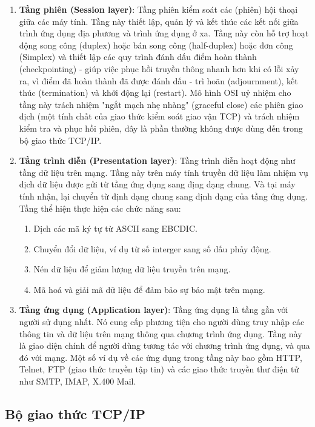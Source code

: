 \documentclass[a4paper,12pt]{article}
\begin{document}
\begin{enumerate}
    \item \textbf{Tầng phiên (Session layer)}: Tầng phiên kiểm soát các (phiên) hội thoại giữa các máy tính. Tầng này thiết lập, quản lý và kết thúc các kết nối giữa trình ứng dụng địa phương và trình ứng dụng ở xa. Tầng này còn hỗ trợ hoạt động song công (duplex) hoặc bán song công (half-duplex) hoặc đơn công (Simplex) và thiết lập các quy trình đánh dấu điểm hoàn thành (checkpointing) - giúp việc phục hồi truyền thông nhanh hơn khi có lỗi xảy ra, vì điểm đã hoàn thành đã được đánh dấu - trì hoãn (adjournment), kết thúc (termination) và khởi động lại (restart). Mô hình OSI uỷ nhiệm cho tầng này trách nhiệm "ngắt mạch nhẹ nhàng" (graceful close) các phiên giao dịch (một tính chất của giao thức kiểm soát giao vận TCP) và trách nhiệm kiểm tra và phục hồi phiên, đây là phần thường không được dùng đến trong bộ giao thức TCP/IP.
    \item \textbf{Tầng trình diễn (Presentation layer)}: Tầng trình diễn hoạt động như tầng dữ liệu trên mạng. Tầng này trên máy tính truyền dữ liệu làm nhiệm vụ dịch dữ liệu được gửi từ tầng ứng dụng sang địng dạng chung. Và tại máy tính nhận, lại chuyển từ định dạng chung sang định dạng của tầng ứng dụng. Tầng thể hiện thực hiện các chức năng sau:
    \begin{enumerate}
        \item Dịch các mã ký tự từ ASCII sang EBCDIC.
        \item Chuyển đổi dữ liệu, ví dụ từ số interger sang số dấu phảy động.
        \item Nén dữ liệu để giảm lượng dữ liệu truyền trên mạng.
        \item Mã hoá và giải mã dữ liệu để đảm bảo sự bảo mật trên mạng.
    \end{enumerate}


    \item \textbf{Tầng ứng dụng (Application layer)}: Tầng ứng dụng là tầng gần với người sử dụng nhất. Nó cung cấp phương tiện cho người dùng truy nhập các thông tin và dữ liệu trên mạng thông qua chương trình ứng dụng. Tầng này là giao diện chính để người dùng tương tác với chương trình ứng dụng, và qua đó với mạng. Một số ví dụ về các ứng dụng trong tầng này bao gồm HTTP, Telnet, FTP (giao thức truyền tập tin) và các giao thức truyền thư điện tử như SMTP, IMAP, X.400 Mail.
\end{enumerate}

\subsection{Bộ giao thức TCP/IP}
\end{document}
